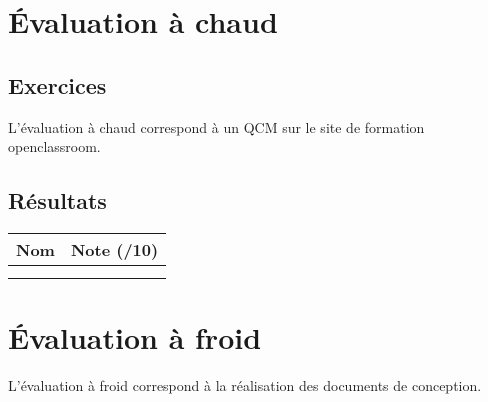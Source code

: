 \documentclass[asi, sansVersion]{picInsa}
\begin{document}
	\newpage
	\section*{Évaluation à chaud}
		\subsection*{Exercices}
		L'évaluation à chaud correspond à un QCM sur le site de formation openclassroom.

			
		\subsection*{Résultats}
			\begin{longtable}{|p{0.5\textwidth}|p{}|}
				\hline
					\rowcolor[gray]{0.90} Nom & Note (/10) \\
				\hline
					\Mathieu &  \\
				\hline
					\Julie &  \\
				\hline
			
			\end{longtable}
			
	\newpage
	\section*{Évaluation à froid}
		L'évaluation à froid correspond à la réalisation des documents de conception.
\end{document}
